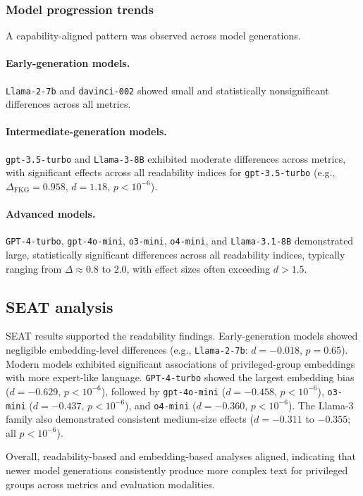 \subsubsection{Model progression trends}
A capability-aligned pattern was observed across model generations.

\paragraph{Early-generation models.}
\texttt{Llama-2-7b} and \texttt{davinci-002} showed small and statistically nonsignificant differences across all metrics.

\paragraph{Intermediate-generation models.}
\texttt{gpt-3.5-turbo} and \texttt{Llama-3-8B} exhibited moderate differences across metrics, with significant effects across all readability indices for \texttt{gpt-3.5-turbo} (e.g., $\Delta_{\mathrm{FKG}} = 0.958$, $d = 1.18$, $p < 10^{-6}$).

\paragraph{Advanced models.}
\texttt{GPT-4-turbo}, \texttt{gpt-4o-mini}, \texttt{o3-mini}, \texttt{o4-mini}, and \texttt{Llama-3.1-8B} demonstrated large, statistically significant differences across all readability indices, typically ranging from $\Delta \approx 0.8$ to $2.0$, with effect sizes often exceeding $d>1.5$.

\subsection{SEAT analysis}
SEAT results supported the readability findings.  
Early-generation models showed negligible embedding-level differences (e.g., \texttt{Llama-2-7b}: $d = -0.018$, $p = 0.65$).  
Modern models exhibited significant associations of privileged-group embeddings with more expert-like language.  
\texttt{GPT-4-turbo} showed the largest embedding bias ($d = -0.629$, $p < 10^{-6}$), followed by \texttt{gpt-4o-mini} ($d = -0.458$, $p < 10^{-6}$), \texttt{o3-mini} ($d = -0.437$, $p < 10^{-6}$), and \texttt{o4-mini} ($d = -0.360$, $p < 10^{-6}$).  
The Llama-3 family also demonstrated consistent medium-size effects ($d = -0.311$ to $-0.355$; all $p < 10^{-6}$).

Overall, readability-based and embedding-based analyses aligned, indicating that newer model generations consistently produce more complex text for privileged groups across metrics and evaluation modalities.

